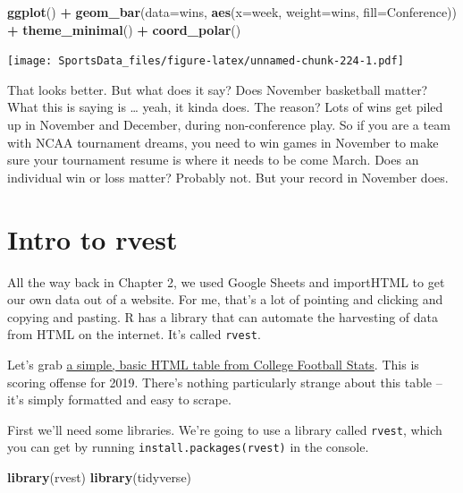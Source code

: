 \documentclass[]{book}
\newenvironment{Shaded}{\begin{snugshade}}{\end{snugshade}}
\newcommand{\DataTypeTok}[1]{\textcolor[rgb]{0.13,0.29,0.53}{#1}}
\newcommand{\KeywordTok}[1]{\textcolor[rgb]{0.13,0.29,0.53}{\textbf{#1}}}
\newcommand{\NormalTok}[1]{#1}
\newcommand{\OperatorTok}[1]{\textcolor[rgb]{0.81,0.36,0.00}{\textbf{#1}}}
\newcommand{\StringTok}[1]{\textcolor[rgb]{0.31,0.60,0.02}{#1}}
\begin{document}
\begin{Shaded}
\begin{Highlighting}[]
\KeywordTok{ggplot}\NormalTok{() }\OperatorTok{+}\StringTok{ }\KeywordTok{geom_bar}\NormalTok{(}\DataTypeTok{data=}\NormalTok{wins, }\KeywordTok{aes}\NormalTok{(}\DataTypeTok{x=}\NormalTok{week, }\DataTypeTok{weight=}\NormalTok{wins, }\DataTypeTok{fill=}\NormalTok{Conference)) }\OperatorTok{+}\StringTok{ }\KeywordTok{theme_minimal}\NormalTok{() }\OperatorTok{+}\StringTok{ }\KeywordTok{coord_polar}\NormalTok{()}
\end{Highlighting}
\end{Shaded}

\texttt{[image: SportsData\_files/figure-latex/unnamed-chunk-224-1.pdf]}

That looks better. But what does it say? Does November basketball matter? What this is saying is \ldots{} yeah, it kinda does. The reason? Lots of wins get piled up in November and December, during non-conference play. So if you are a team with NCAA tournament dreams, you need to win games in November to make sure your tournament resume is where it needs to be come March. Does an individual win or loss matter? Probably not. But your record in November does.

\hypertarget{intro-to-rvest}{%
\chapter{Intro to rvest}\label{intro-to-rvest}}

All the way back in Chapter 2, we used Google Sheets and importHTML to get our own data out of a website. For me, that's a lot of pointing and clicking and copying and pasting. R has a library that can automate the harvesting of data from HTML on the internet. It's called \texttt{rvest}.

Let's grab \href{http://www.cfbstats.com/2019/leader/national/team/offense/split01/category09/sort01.html}{a simple, basic HTML table from College Football Stats}. This is scoring offense for 2019. There's nothing particularly strange about this table -- it's simply formatted and easy to scrape.

First we'll need some libraries. We're going to use a library called \texttt{rvest}, which you can get by running \texttt{install.packages(\textquotesingle{}rvest\textquotesingle{})} in the console.

\begin{Shaded}
\begin{Highlighting}[]
\KeywordTok{library}\NormalTok{(rvest)}
\KeywordTok{library}\NormalTok{(tidyverse)}
\end{Highlighting}
\end{Shaded}
\end{document}
